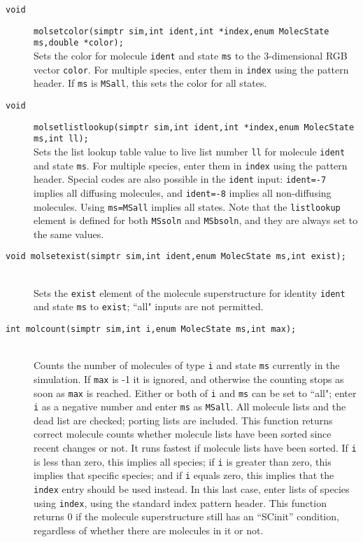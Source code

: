 \documentclass {scrbook}
\newcommand {\ttt} {\texttt}
\begin{document}
\begin{description}
\item[\ttt{void}]
\ttt{molsetcolor(simptr sim,int ident,int *index,enum MolecState ms,double *color);}
\hfill \\
Sets the color for molecule \ttt{ident} and state \ttt{ms} to the 3-dimensional RGB vector \ttt{color}. For multiple species, enter them in \ttt{index} using the pattern header. If \ttt{ms} is \ttt{MSall}, this sets the color for all states.

\item[\ttt{void}]
\ttt{molsetlistlookup(simptr sim,int ident,int *index,enum MolecState ms,int ll);}
\hfill \\
Sets the list lookup table value to live list number \ttt{ll} for molecule \ttt{ident} and state \ttt{ms}. For multiple species, enter them in \ttt{index} using the pattern header. Special codes are also possible in the \ttt{ident} input: \ttt{ident=-7} implies all diffusing molecules, and \ttt{ident=-8} implies all non-diffusing molecules. Using \ttt{ms=MSall} implies all states. Note that the \ttt{listlookup} element is defined for both \ttt{MSsoln} and \ttt{MSbsoln}, and they are always set to the same values.

\item[\ttt{void molsetexist(simptr sim,int ident,enum MolecState ms,int exist);}]
\hfill \\
Sets the \ttt{exist} element of the molecule superstructure for identity \ttt{ident} and state \ttt{ms} to \ttt{exist}; ``all" inputs are not permitted.

\item[\ttt{int molcount(simptr sim,int i,enum MolecState ms,int max);}]
\hfill \\
Counts the number of molecules of type \ttt{i} and state \ttt{ms} currently in the simulation. If \ttt{max} is -1 it is ignored, and otherwise the counting stops as soon as \ttt{max} is reached. Either or both of \ttt{i} and \ttt{ms} can be set to ``all"; enter \ttt{i} as a negative number and enter \ttt{ms} as \ttt{MSall}. All molecule lists and the dead list are checked; porting lists are included. This function returns correct molecule counts whether molecule lists have been sorted since recent changes or not. It runs fastest if molecule lists have been sorted. If \ttt{i} is less than zero, this implies all species; if \ttt{i} is greater than zero, this implies that specific species; and if \ttt{i} equals zero, this implies that the \ttt{index} entry should be used instead. In this last case, enter lists of species using \ttt{index}, using the standard index pattern header. This function returns 0 if the molecule superstructure still has an ``SCinit'' condition, regardless of whether there are molecules in it or not.


\end{description}
\end{document}
